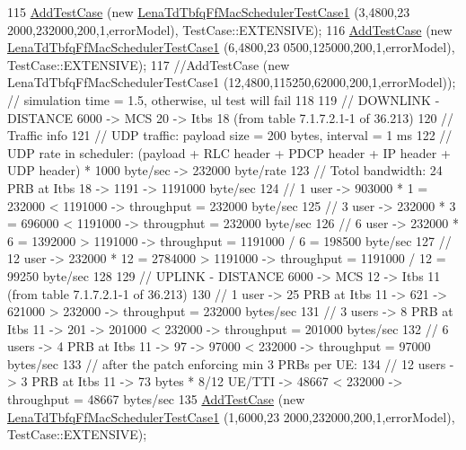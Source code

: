 \begin{DoxyCode}
115   \hyperlink{classns3_1_1TestCase_a3718088e3eefd5d6454569d2e0ddd835}{AddTestCase} (\textcolor{keyword}{new} \hyperlink{classLenaTdTbfqFfMacSchedulerTestCase1}{LenaTdTbfqFfMacSchedulerTestCase1} (3,4800,23
      2000,232000,200,1,errorModel), TestCase::EXTENSIVE);
116   \hyperlink{classns3_1_1TestCase_a3718088e3eefd5d6454569d2e0ddd835}{AddTestCase} (\textcolor{keyword}{new} \hyperlink{classLenaTdTbfqFfMacSchedulerTestCase1}{LenaTdTbfqFfMacSchedulerTestCase1} (6,4800,23
      0500,125000,200,1,errorModel), TestCase::EXTENSIVE);
117   \textcolor{comment}{//AddTestCase (new LenaTdTbfqFfMacSchedulerTestCase1 (12,4800,115250,62000,200,1,errorModel)); //
       simulation time = 1.5, otherwise, ul test will fail}
118 
119   \textcolor{comment}{// DOWNLINK - DISTANCE 6000 -> MCS 20 -> Itbs 18 (from table 7.1.7.2.1-1 of 36.213)}
120   \textcolor{comment}{// Traffic info}
121   \textcolor{comment}{//   UDP traffic: payload size = 200 bytes, interval = 1 ms}
122   \textcolor{comment}{//   UDP rate in scheduler: (payload + RLC header + PDCP header + IP header + UDP header) * 1000 byte/sec
       -> 232000 byte/rate }
123   \textcolor{comment}{// Totol bandwidth: 24 PRB at Itbs 18 -> 1191 -> 1191000 byte/sec}
124   \textcolor{comment}{// 1 user -> 903000 * 1 = 232000 < 1191000 -> throughput = 232000 byte/sec}
125   \textcolor{comment}{// 3 user -> 232000 * 3 = 696000 < 1191000 -> througphut = 232000 byte/sec}
126   \textcolor{comment}{// 6 user -> 232000 * 6 = 1392000 > 1191000 -> throughput = 1191000 / 6 = 198500 byte/sec}
127   \textcolor{comment}{// 12 user -> 232000 * 12 = 2784000 > 1191000 -> throughput =  1191000 / 12 = 99250 byte/sec}
128 
129   \textcolor{comment}{// UPLINK - DISTANCE 6000 -> MCS 12 -> Itbs 11 (from table 7.1.7.2.1-1 of 36.213)}
130   \textcolor{comment}{// 1 user -> 25 PRB at Itbs 11 -> 621 -> 621000 > 232000 -> throughput = 232000 bytes/sec}
131   \textcolor{comment}{// 3 users -> 8 PRB at Itbs 11 -> 201 -> 201000 < 232000 -> throughput = 201000  bytes/sec}
132   \textcolor{comment}{// 6 users -> 4 PRB at Itbs 11 -> 97 -> 97000 < 232000 -> throughput = 97000 bytes/sec}
133   \textcolor{comment}{// after the patch enforcing min 3 PRBs per UE:}
134   \textcolor{comment}{// 12 users -> 3 PRB at Itbs 11 -> 73 bytes * 8/12 UE/TTI -> 48667 < 232000 -> throughput = 48667
       bytes/sec}
135   \hyperlink{classns3_1_1TestCase_a3718088e3eefd5d6454569d2e0ddd835}{AddTestCase} (\textcolor{keyword}{new} \hyperlink{classLenaTdTbfqFfMacSchedulerTestCase1}{LenaTdTbfqFfMacSchedulerTestCase1} (1,6000,23
      2000,232000,200,1,errorModel), TestCase::EXTENSIVE);

\end{DoxyCode}

